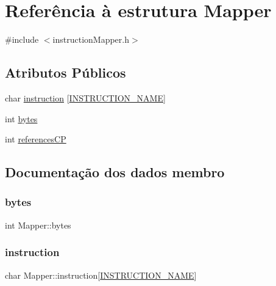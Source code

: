 \hypertarget{struct_mapper}{}\section{Referência à estrutura Mapper}
\label{struct_mapper}


{\ttfamily \#include $<$instruction\+Mapper.\+h$>$}

\subsection*{Atributos Públicos}
\begin{DoxyCompactItemize}
\item 
char \hyperlink{struct_mapper_accd08fb22057870b05be442ff0a4f580}{instruction} \mbox{[}\hyperlink{instruction_mapper_8h_ab77522c65df7d18cddc66f4f74a47f29}{I\+N\+S\+T\+R\+U\+C\+T\+I\+O\+N\+\_\+\+N\+A\+ME}\mbox{]}
\item 
int \hyperlink{struct_mapper_a03ccd2444e65aa0b113fb0f97b73f6f6}{bytes}
\item 
int \hyperlink{struct_mapper_af2d2cc85289235cb8ba33cb807404241}{references\+CP}
\end{DoxyCompactItemize}


\subsection{Documentação dos dados membro}
\hypertarget{struct_mapper_a03ccd2444e65aa0b113fb0f97b73f6f6}{}\label{struct_mapper_a03ccd2444e65aa0b113fb0f97b73f6f6} 
\subsubsection{\texorpdfstring{bytes}{bytes}}
{\footnotesize\ttfamily int Mapper\+::bytes}

\hypertarget{struct_mapper_accd08fb22057870b05be442ff0a4f580}{}\label{struct_mapper_accd08fb22057870b05be442ff0a4f580} 
\subsubsection{\texorpdfstring{instruction}{instruction}}
{\footnotesize\ttfamily char Mapper\+::instruction\mbox{[}\hyperlink{instruction_mapper_8h_ab77522c65df7d18cddc66f4f74a47f29}{I\+N\+S\+T\+R\+U\+C\+T\+I\+O\+N\+\_\+\+N\+A\+ME}\mbox{]}}

